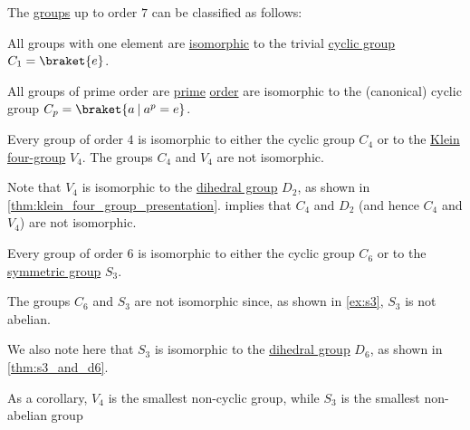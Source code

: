 \begin{proposition}\label{thm:clasification_of_small_groups}
  The \hyperref[def:group]{groups} up to order \( 7 \) can be classified as follows:
  \begin{thmenum}
     All groups with one element are \hyperref[def:group/homomorphism]{isomorphic} to the trivial \hyperref[def:cyclic_group]{cyclic group} \( C_1 = \braket{ e } \).

     All groups of prime order are \hyperref[def:prime_number]{prime} \hyperref[def:group_order]{order} are isomorphic to the (canonical) cyclic group \( C_p = \braket{ a \given a^p = e } \).

     Every group of order \( 4 \) is isomorphic to either the cyclic group \( C_4 \) or to the \hyperref[def:klein_four_group]{Klein four-group} \( V_4 \). The groups \( C_4 \) and \( V_4 \) are not isomorphic.

    Note that \( V_4 \) is isomorphic to the \hyperref[def:dihedral_group]{dihedral group} \( D_2 \), as shown in \cref{thm:klein_four_group_presentation}.  implies that \( C_4 \) and \( D_2 \) (and hence \( C_4 \) and \( V_4 \)) are not isomorphic.

     Every group of order \( 6 \) is isomorphic to either the cyclic group \( C_6 \) or to the \hyperref[def:symmetric_group]{symmetric group} \( S_3 \).

    The groups \( C_6 \) and \( S_3 \) are not isomorphic since, as shown in \cref{ex:s3}, \( S_3 \) is not abelian.

    We also note here that \( S_3 \) is isomorphic to the \hyperref[def:dihedral_group]{dihedral group} \( D_6 \), as shown in \cref{thm:s3_and_d6}.
  \end{thmenum}
\end{proposition}
\begin{comments}
  \item As a corollary, \( V_4 \) is the smallest non-cyclic group, while \( S_3 \) is the smallest non-abelian group
\end{comments}
